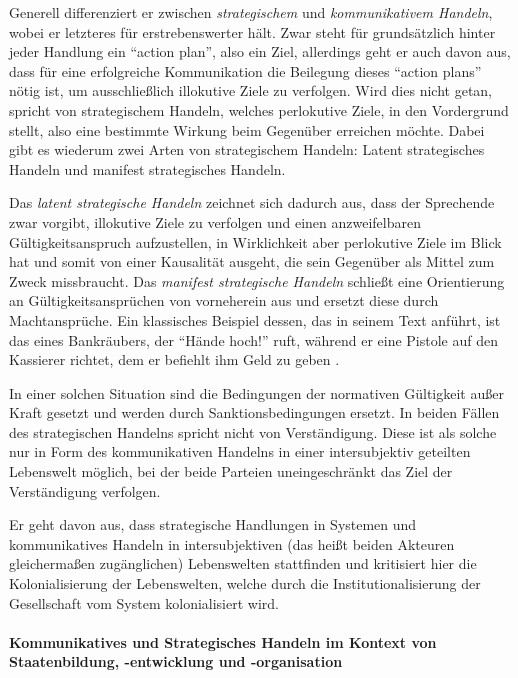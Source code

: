 Generell differenziert er zwischen \emph{strategischem} und \emph{kommunikativem Handeln}, wobei er letzteres für erstrebenswerter hält.
Zwar steht für \citeauthor{Habermas-1998-aa} grundsätzlich hinter jeder Handlung ein ``action plan'', also ein Ziel, allerdings geht er auch davon aus, dass für eine erfolgreiche Kommunikation die Beilegung dieses ``action plans'' nötig ist, um ausschließlich illokutive Ziele zu verfolgen.
Wird dies nicht getan, spricht \citeauthor{Habermas-1998-aa} von strategischem Handeln, welches perlokutive Ziele, in den Vordergrund stellt, also eine bestimmte Wirkung beim Gegenüber erreichen möchte.
Dabei gibt es wiederum zwei Arten von strategischem Handeln:
Latent strategisches Handeln und manifest strategisches Handeln.

Das \emph{latent strategische Handeln} zeichnet sich dadurch aus, dass der Sprechende zwar vorgibt, illokutive Ziele zu verfolgen und einen anzweifelbaren Gültigkeitsanspruch aufzustellen, in Wirklichkeit aber perlokutive Ziele im Blick hat und somit von einer Kausalität ausgeht, die sein Gegenüber als Mittel zum Zweck missbraucht.
Das \emph{manifest strategische Handeln} schließt eine Orientierung an Gültigkeitsansprüchen von vorneherein aus und ersetzt diese durch Machtansprüche.
Ein klassisches Beispiel dessen, das \citeauthor{Habermas-1998-aa} in seinem Text anführt, ist das eines Bankräubers, der ``Hände hoch!'' ruft, während er eine Pistole auf den Kassierer richtet, dem er befiehlt ihm Geld zu geben \parencite[vgl.][225]{Habermas-1998-aa}.

In einer solchen Situation sind die Bedingungen der normativen Gültigkeit außer Kraft gesetzt und werden durch Sanktionsbedingungen ersetzt.
In beiden Fällen des strategischen Handelns spricht \citeauthor{Habermas-1998-aa} nicht von Verständigung.
Diese ist als solche nur in Form des kommunikativen Handelns in einer intersubjektiv geteilten Lebenswelt möglich, bei der beide Parteien uneingeschränkt das Ziel der Verständigung verfolgen.

Er geht davon aus, dass strategische Handlungen in Systemen und kommunikatives Handeln in intersubjektiven (das heißt beiden Akteuren gleichermaßen zugänglichen) Lebenswelten stattfinden und kritisiert hier die Kolonialisierung der Lebenswelten, welche durch die Institutionalisierung der Gesellschaft vom System kolonialisiert wird.


\paragraph{Kommunikatives und Strategisches Handeln im Kontext von Staatenbildung, -entwicklung und -organisation}

